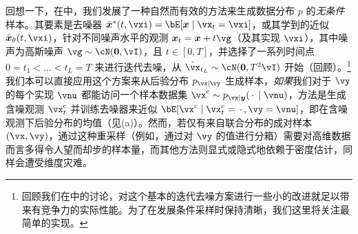 \documentclass[../../book-main.tex]{subfiles}
\begin{document}
回想一下，在中，我们发展了一种自然而有效的方法来生成数据分布 $p$ 的\textit{无条件}样本。其要素是去噪器 $\bar{\x}^\ast(t, \vxi) = \bE[ \x \mid \vx_t=\vxi ]$，或其学到的近似 $\bar{\x}_{\theta}(t, \vxi)$，针对不同噪声水平的观测 $\x_t = \x + t \vg$（及其实现 $\vxi$），其中噪声为高斯噪声 $\vg \sim \cN(\mathbf{0}, \vI)$，且 $t \in [0, T]$，并选择了一系列时间点 $0 = t_1 < \hdots < t_{L} = T$ 来进行迭代去噪，从 $\hat{\vx}_{t_L} \sim \cN(\mathbf{0}, T^2 \vI)$ 开始（回顾）。\footnote{回顾我们在中的讨论，对这个基本的迭代去噪方案进行一些小的改进就足以带来有竞争力的实际性能。为了在发展条件采样时保持清晰，我们这里将关注最简单的实现。}
我们本可以直接应用这个方案来从后验分布 $p_{\vx \mid \vy}$ 生成样本，\textit{如果}我们对于 $\vy$ 的每个实现 $\vnu$ 都能访问一个样本数据集 $\posteriorsample \sim p_{\vx \mid \y}(\spcdot \mid \vnu)$，方法是生成含噪观测 $\posteriorsample_t$ 并训练去噪器来近似 $\bE[ \posteriorsample \mid \posteriorsample_t=\spcdot, \vy=\vnu ]$，即在含噪观测下后验分布的均值（见(a)）。然而，若仅有来自联合分布的成对样本 $(\vx, \vy)$，通过这种重采样（例如，通过对 $\vy$ 的值进行分箱）需要对高维数据而言多得令人望而却步的样本量，而其他方法则显式或隐式地依赖于密度估计，同样会遭受维度灾难。
\end{document}
